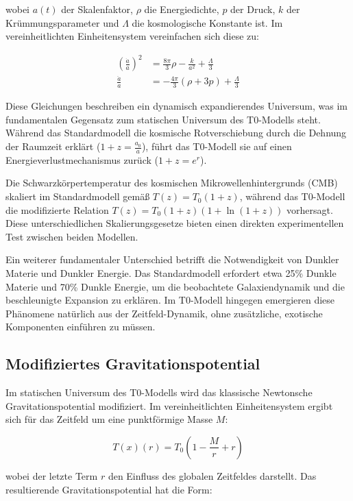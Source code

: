 \documentclass[12pt,a4paper]{article}
\newcommand{\Tfield}{T(x)}
\newcommand{\Tzero}{T_0}
\begin{document}
	wobei \(a(t)\) der Skalenfaktor, \(\rho\) die Energiedichte, \(p\) der Druck, \(k\) der Krümmungsparameter und \(\Lambda\) die kosmologische Konstante ist. Im vereinheitlichten Einheitensystem vereinfachen sich diese zu:
	
	\begin{align}
		\left(\frac{\dot{a}}{a}\right)^2 &= \frac{8\pi}{3}\rho - \frac{k}{a^2} + \frac{\Lambda}{3} \\
		\frac{\ddot{a}}{a} &= -\frac{4\pi}{3}(\rho + 3p) + \frac{\Lambda}{3}
	\end{align}
	
	Diese Gleichungen beschreiben ein dynamisch expandierendes Universum, was im fundamentalen Gegensatz zum statischen Universum des T0-Modells steht. Während das Standardmodell die kosmische Rotverschiebung durch die Dehnung der Raumzeit erklärt (\(1+z = \frac{a_0}{a}\)), führt das T0-Modell sie auf einen Energieverlustmechanismus zurück (\(1+z = e^r\)).
	
	Die Schwarzkörpertemperatur des kosmischen Mikrowellenhintergrunds (CMB) skaliert im Standardmodell gemäß \(T(z) = T_0(1+z)\), während das T0-Modell die modifizierte Relation \(T(z) = T_0(1+z)(1+\ln(1+z))\) vorhersagt. Diese unterschiedlichen Skalierungsgesetze bieten einen direkten experimentellen Test zwischen beiden Modellen.
	
	Ein weiterer fundamentaler Unterschied betrifft die Notwendigkeit von Dunkler Materie und Dunkler Energie. Das Standardmodell erfordert etwa 25\% Dunkle Materie und 70\% Dunkle Energie, um die beobachtete Galaxiendynamik und die beschleunigte Expansion zu erklären. Im T0-Modell hingegen emergieren diese Phänomene natürlich aus der Zeitfeld-Dynamik, ohne zusätzliche, exotische Komponenten einführen zu müssen.
	
	\subsection{Modifiziertes Gravitationspotential}
	
	Im statischen Universum des T0-Modells wird das klassische Newtonsche Gravitationspotential modifiziert. Im vereinheitlichten Einheitensystem ergibt sich für das Zeitfeld um eine punktförmige Masse \(M\):
	
	\begin{equation}
		\Tfield(r) = \Tzero\left(1 - \frac{M}{r} + r\right)
	\end{equation}
	
	wobei der letzte Term \(r\) den Einfluss des globalen Zeitfeldes darstellt. Das resultierende Gravitationspotential hat die Form:
	
\end{document}
